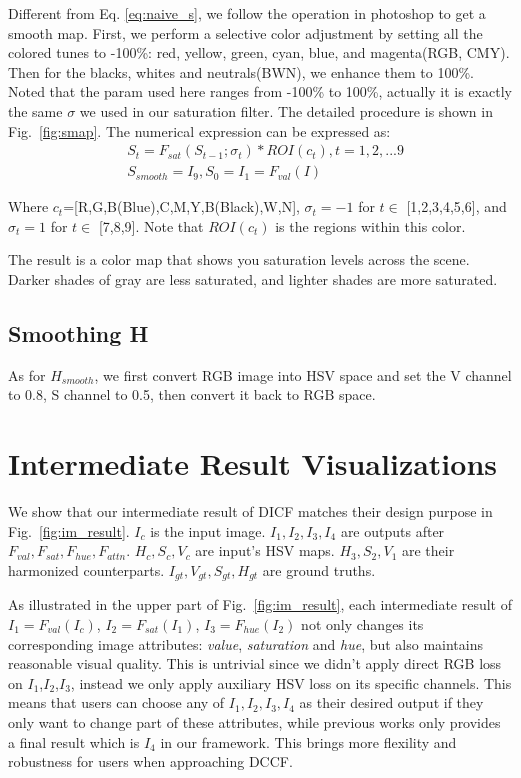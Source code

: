 \documentclass[runningheads]{llncs}
\begin{document}
Different from Eq. \ref{eq:naive_s}, we follow the operation in photoshop to get a smooth map.
First, we perform a selective color adjustment by setting all the colored tunes to -100\%: red, yellow, green, cyan, blue, and magenta(RGB, CMY).
Then for the blacks, whites and neutrals(BWN), we enhance them to 100\%. Noted that the param used here ranges from -100\% to 100\%, actually it is exactly the same $\sigma$ we used in our saturation filter.
The detailed procedure is shown in Fig.~\ref{fig:smap}.
The numerical expression can be expressed as:
\begin{align}
	&S_{t} = F_{sat}(S_{t-1};\sigma_t) * ROI(c_t), t=1,2,...9 \\
	&S_{smooth} = I_9, S_0 = I_1 = F_{val}(I)
\end{align}

Where $c_t$=[R,G,B(Blue),C,M,Y,B(Black),W,N], $\sigma_t=-1$ for $t\in$ [1,2,3,4,5,6], and $\sigma_t=1$ for $t\in$ [7,8,9]. 
Note that $ROI(c_t)$ is the regions within this color.



The result is a color map that shows you saturation levels across the scene. Darker shades of gray are less saturated, and lighter shades are more saturated.


\subsection{Smoothing H}

As for $H_{smooth}$, we first convert RGB image into HSV space and set the V channel to 0.8, S channel to 0.5, then convert it back to RGB space.



\section{Intermediate Result Visualizations}
\label{intermediate}

We show that our intermediate result of DICF matches their design purpose in Fig.~\ref{fig:im_result}. 
$I_c$ is the input image. $I_1,I_2,I_3,I_4$ are outputs after $F_{val},F_{sat},F_{hue},F_{attn}$. 
$H_c,S_c,V_c$ are input's HSV maps. 
$H_3, S_2, V_1$ are their harmonized counterparts.
$I_{gt},V_{gt},S_{gt}, H_{gt}$ are ground truths.


As illustrated in the upper part of Fig.~\ref{fig:im_result}, each intermediate result of $I_1=F_{val}(I_c)$, $I_2=F_{sat}(I_1)$, $I_3=F_{hue}(I_2)$ not only changes its corresponding image attributes: \textit{value}, \textit{saturation} and \textit{hue}, but also maintains reasonable visual quality.
This is untrivial since we didn't apply direct RGB loss on $I_1$,$I_2$,$I_3$, instead we only apply auxiliary HSV loss on its specific channels.
This means that users can choose any of $I_1, I_2, I_3, I_4$ as their desired output if they only want to change part of these attributes, while previous works only provides a final result which is $I_4$ in our framework.
This brings more flexility and robustness for users when approaching DCCF.
\end{document}
